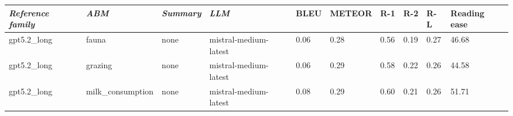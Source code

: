 \begin{tabular}{|l|l|l|l|l|l|l|l|l|l|}
\hline
\textit{\textbf{Reference family}} & \textit{\textbf{ABM}} & \textit{\textbf{Summary}} & \textit{\textbf{LLM}} & BLEU & METEOR & R-1 & R-2 & R-L & Reading ease \\
 \hline
 gpt5.2\_long & fauna & none & mistral-medium-latest & 0.06 & 0.28 & 0.56 & 0.19 & 0.27 & 46.68 \\
 \hline
 gpt5.2\_long & grazing & none & mistral-medium-latest & 0.06 & 0.29 & 0.58 & 0.22 & 0.26 & 44.58 \\
 \hline
 gpt5.2\_long & milk\_consumption & none & mistral-medium-latest & 0.08 & 0.29 & 0.60 & 0.21 & 0.26 & 51.71 \\
\hline
\end{tabular}
